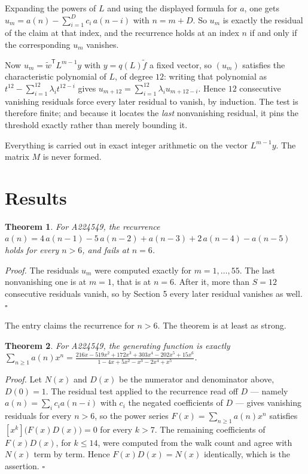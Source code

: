 \documentclass[11pt]{article}
\newtheorem{theorem}{Theorem}
\theoremstyle{definition}
\begin{document}
Expanding the powers of $L$ and using the displayed formula for $a$, one gets $u_m = a(n) - \sum_{i=1}^{D} c_i\,a(n-i)$ with $n = m + D$. So $u_m$ is exactly the residual of the claim at that index, and the recurrence holds at an index $n$ if and only if the corresponding $u_m$ vanishes.

Now $u_m = \tilde w^{\mathsf T} L^{m-1} y$ with $y = q(L)\tilde f$ a fixed vector, so $(u_m)$ satisfies the characteristic polynomial of $L$, of degree $12$: writing that polynomial as $t^{12} - \sum_{i=1}^{12} \lambda_i t^{12-i}$ gives $u_{m+12} = \sum_{i=1}^{12} \lambda_i u_{m+12-i}$. Hence $12$ consecutive vanishing residuals force every later residual to vanish, by induction. The test is therefore finite; and because it locates the {\itshape last} nonvanishing residual, it pins the threshold exactly rather than merely bounding it.

Everything is carried out in exact integer arithmetic on the vector $L^{m-1}y$. The matrix $M$ is never formed.

\section{Results}

\begin{theorem} For A224549, the recurrence $a(n) = 4\,a(n-1) - 5\,a(n-2) + a(n-3) + 2\,a(n-4) - a(n-5)$ holds for every $n > 6$, and fails at $n = 6$.\end{theorem}

{\itshape Proof.} The residuals $u_m$ were computed exactly for $m = 1,\dots,55$. The last nonvanishing one is at $m = 1$, that is at $n = 6$. After it, more than $S = 12$ consecutive residuals vanish, so by Section 5 every later residual vanishes as well. $\square$

The entry claims the recurrence for $n > 6$. The theorem is at least as strong.

\begin{theorem} For A224549, the generating function is exactly $\sum_{n\ge 1} a(n)x^n = \frac{216x - 519x^{2} + 172x^{3} + 303x^{4} - 202x^{5} + 15x^{6}}{1 - 4x + 5x^{2} - x^{3} - 2x^{4} + x^{5}}$.\end{theorem}

{\itshape Proof.} Let $N(x)$ and $D(x)$ be the numerator and denominator above, $D(0)=1$. The residual test applied to the recurrence read off $D$ --- namely $a(n) = \sum_i c_i a(n-i)$ with $c_i$ the negated coefficients of $D$ --- gives vanishing residuals for every $n > 6$, so the power series $F(x)=\sum_{n\ge 1}a(n)x^n$ satisfies $[x^k]\bigl(F(x)D(x)\bigr) = 0$ for every $k > 7$. The remaining coefficients of $F(x)D(x)$, for $k \le 14$, were computed from the walk count and agree with $N(x)$ term by term. Hence $F(x)D(x) = N(x)$ identically, which is the assertion. $\square$
\end{document}
